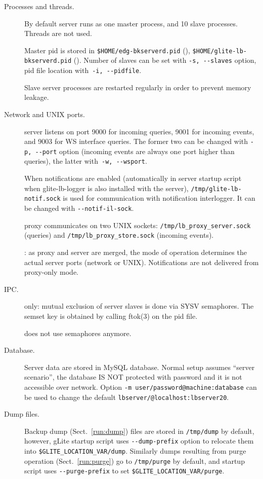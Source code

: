 \begin{description}
\item[Processes and threads.]
By default \LB server runs as one master process,
and 10 slave processes.
Threads are not used.

Master pid is stored in \verb'$HOME/edg-bkserverd.pid' (\LBold),
\verb'$HOME/glite-lb-bkserverd.pid' (\LBnew).
Number of slaves can be set with \verb'-s, --slaves' option,
pid file location with~\verb'-i, --pidfile'.

Slave server processes are restarted regularly in order to prevent
memory leakage.

\item[Network and UNIX ports.]
\LB server listens on port 9000 for incoming queries,
9001 for incoming events, and 9003 for WS interface queries.
The former two can be changed with \verb'-p, --port' option
(incoming events are always one port higher than queries), 
the latter with~\verb'-w, --wsport'.

When \LB notifications are enabled (automatically in server startup script when 
glite-lb-logger is also installed with the server), 
\verb'/tmp/glite-lb-notif.sock' is used for communication with notification interlogger.
It can be changed with \verb'--notif-il-sock'.

\LB proxy communicates on two UNIX sockets:
\verb'/tmp/lb_proxy_server.sock' (queries) and 
\verb'/tmp/lb_proxy_store.sock' (incoming events).

\LBnew: as proxy and server are merged, the mode of operation determines
the actual server ports (network or UNIX).
Notifications are not delivered from proxy-only mode.

\item[IPC.] \LBold only: mutual exclusion of server slaves is done
via SYSV semaphores. The semset key is obtained by calling ftok(3) on 
the pid file.

\LBnew does not use semaphores anymore.

\item[Database.]
Server data are stored in MySQL database. Normal setup assumes ``server scenario'', 
\ie the database IS NOT protected with password and it is not accessible over network.
Option \verb'-m user/password@machine:database' can be used to change
the default \verb'lbserver/@localhost:lbserver20'.

\item[Dump files.]
Backup dump (Sect.~\ref{run:dump}) files are stored in
\verb'/tmp/dump' by default, however, gLite startup script uses
\verb'--dump-prefix' option to relocate them into \verb'$GLITE_LOCATION_VAR/dump'.
Similarly dumps resulting from purge operation (Sect.~\ref{run:purge})
go to \verb'/tmp/purge' by default, and startup script uses \verb'--purge-prefix'
to set \verb'$GLITE_LOCATION_VAR/purge'.


\end{description}
